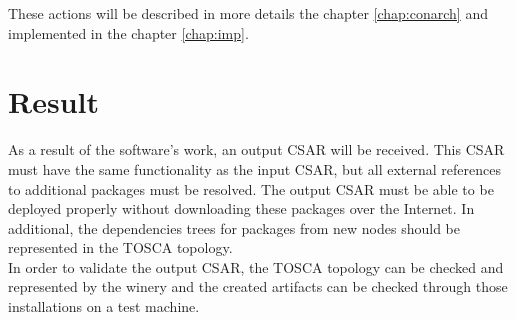 These actions will be described in more details the chapter \ref{chap:conarch} and implemented in the chapter \ref{chap:imp}.

\section*{Result}
As a result of the software's work, an output CSAR will be received. 
This CSAR must have the same functionality as the input CSAR, but all external references to additional packages must be resolved.
The output CSAR must be able to be deployed properly without downloading these packages over the Internet. 
In additional, the dependencies trees for packages from new nodes should be represented in the TOSCA topology.\\

In order to validate the output CSAR, the TOSCA topology can be checked and represented by the winery and the created artifacts can be checked through those installations on a test machine. 
